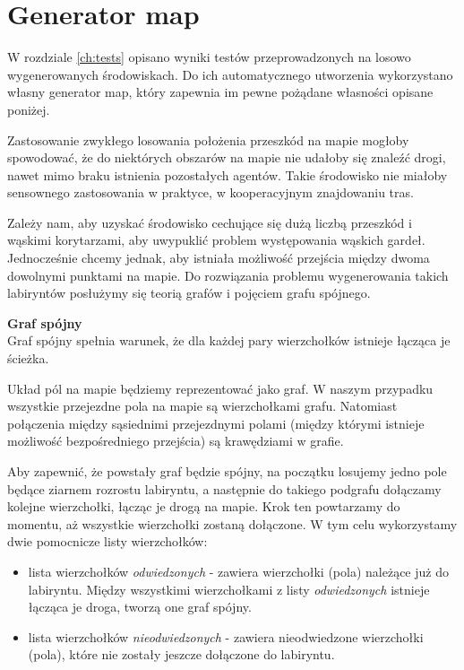 \section{Generator map}
\label{ch:mazegen}

W rozdziale \ref{ch:tests} opisano wyniki testów przeprowadzonych na losowo wygenerowanych środowiskach.
Do ich automatycznego utworzenia wykorzystano własny generator map, który zapewnia im pewne pożądane własności opisane poniżej.

Zastosowanie zwykłego losowania położenia przeszkód na mapie mogłoby spowodować, że do niektórych obszarów na mapie nie udałoby się znaleźć drogi, nawet mimo braku istnienia pozostałych agentów. Takie środowisko nie miałoby sensownego zastosowania w praktyce, w kooperacyjnym znajdowaniu tras.

Zależy nam, aby uzyskać środowisko cechujące się dużą liczbą przeszkód i wąskimi korytarzami, aby uwypuklić problem występowania wąskich gardeł. Jednocześnie chcemy jednak, aby istniała możliwość przejścia między dwoma dowolnymi punktami na mapie.
Do rozwiązania problemu wygenerowania takich labiryntów posłużymy się teorią grafów i pojęciem grafu spójnego.

\begin{definition}{\bf Graf spójny\\}
	Graf spójny spełnia warunek, że dla każdej pary wierzchołków istnieje łącząca je ścieżka.
\end{definition}

Układ pól na mapie będziemy reprezentować jako graf.
W naszym przypadku wszystkie przejezdne pola na mapie są wierzchołkami grafu. Natomiast połączenia między sąsiednimi przejezdnymi polami (między którymi istnieje możliwość bezpośredniego przejścia) są krawędziami w grafie.

Aby zapewnić, że powstały graf będzie spójny, na początku losujemy jedno pole będące ziarnem rozrostu labiryntu, a następnie do takiego podgrafu dołączamy kolejne wierzchołki, łącząc je drogą na mapie. Krok ten powtarzamy do momentu, aż wszystkie wierzchołki zostaną dołączone.
W tym celu wykorzystamy dwie pomocnicze listy wierzchołków:
\begin{itemize}
	\item lista wierzchołków {\it odwiedzonych} - zawiera wierzchołki (pola) należące już do labiryntu. Między wszystkimi wierzchołkami z listy {\it odwiedzonych} istnieje łącząca je droga, tworzą one graf spójny.
	\item lista wierzchołków {\it nieodwiedzonych} - zawiera nieodwiedzone wierzchołki (pola), które nie zostały jeszcze dołączone do labiryntu.
\end{itemize}

